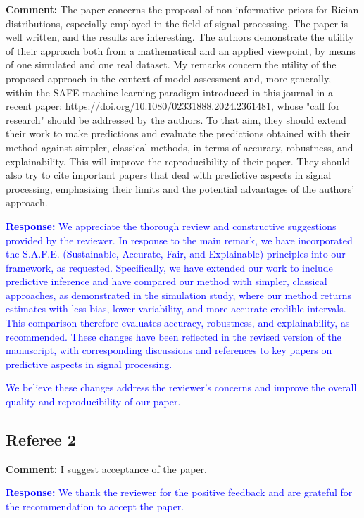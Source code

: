 \documentclass[12pt]{article}
\begin{document}
\textbf{Comment:}  
The paper concerns the proposal of non informative priors for Rician distributions, especially employed in the field of signal processing. The paper is well written, and the results are interesting. The authors demonstrate the utility of their approach both from a mathematical and an applied viewpoint, by means of one simulated and one real dataset.  
My remarks concern the utility of the proposed approach in the context of model assessment and, more generally, within the SAFE machine learning paradigm introduced in this journal in a recent paper: https://doi.org/10.1080/02331888.2024.2361481, whose "call for research" should be addressed by the authors.  
To that aim, they should extend their work to make predictions and evaluate the predictions obtained with their method against simpler, classical methods, in terms of accuracy, robustness, and explainability. This will improve the reproducibility of their paper.  
They should also try to cite important papers that deal with predictive aspects in signal processing, emphasizing their limits and the potential advantages of the authors' approach.

\textcolor{blue}{ \textbf{Response:}
We appreciate the thorough review and constructive suggestions provided by the reviewer. In response to the main remark, we have incorporated the S.A.F.E. (Sustainable, Accurate, Fair, and Explainable) principles into our framework, as requested. Specifically, we have extended our work to include predictive inference and have compared our method with simpler, classical approaches, as demonstrated in the simulation study, where our method returns estimates with less bias, lower variability, and more accurate credible intervals. This comparison therefore evaluates accuracy, robustness, and explainability, as recommended. These changes have been reflected in the revised version of the manuscript, with corresponding discussions and references to key papers on predictive aspects in signal processing.}

\textcolor{blue}{ We believe these changes address the reviewer's concerns and improve the overall quality and reproducibility of our paper.} 

\subsection*{Referee 2}

\textbf{Comment:}  
I suggest acceptance of the paper.


\textcolor{blue}{ \textbf{Response:} 
We thank the reviewer for the positive feedback and are grateful for the recommendation to accept the paper.
}


%

%
\end{document}

